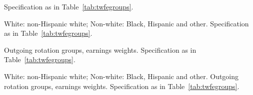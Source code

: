 \documentclass[12pt]{article}
\begin{document}
\begin{table}[H]
\centering
\caption{Two-way fixed effects estimates for school--work status by sex, school months}
\label{tab:twfegroupssex}
\small

\begin{tablenotes}\footnotesize
\item Specification as in Table~\ref{tab:twfegroups}.
\end{tablenotes}
\end{table}

\begin{table}[H]
\centering
\caption{Two-way fixed effects estimates for school--work status by race, school months}
\label{tab:twfegroupsrace}
\small

\begin{tablenotes}\footnotesize
\item White: non-Hispanic white; Non-white: Black, Hispanic and other. Specification as in Table~\ref{tab:twfegroups}.
\end{tablenotes}
\end{table}

\begin{table}[H]
\centering
\caption{Two-way fixed effects estimates for wages and earnings by sex, school months}
\label{tab:twfewagesex}
\small

\begin{tablenotes}\footnotesize
\item Outgoing rotation groups, earnings weights. Specification as in Table~\ref{tab:twfegroups}.
\end{tablenotes}
\end{table}

\begin{table}[H]
\centering
\caption{Two-way fixed effects estimates for wages and earnings by race, school months}
\label{tab:twfewagerace}
\small

\begin{tablenotes}\footnotesize
\item White: non-Hispanic white; Non-white: Black, Hispanic and other. Outgoing rotation groups, earnings weights. Specification as in Table~\ref{tab:twfegroups}.
\end{tablenotes}
\end{table}
\end{document}
